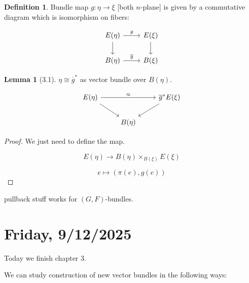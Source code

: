 \documentclass{article}
\theoremstyle{definition}
\newtheorem*{definition}{Definition}
\newtheorem{lemma}[theorem]{Lemma}
\begin{document}
    \begin{definition}
        Bundle map \(g: \eta \to \xi\) [both \(n\)-plane] is given by a commutative diagram which is isomorphism on fibers:

        \[
            \begin{tikzcd}
                E(\eta) \ar[r,"g"] \ar[d] & E(\xi) \ar[d] \\ B(\eta) \ar[r,"\overline{g}"] & B(\xi)
            \end{tikzcd}
        \]
    \end{definition}

    \begin{lemma}
        [3.1] \(\eta \cong \overline{g}^{\ast}\)  as vector bundle over \(B(\eta)\).

        \[
            \begin{tikzcd}
                E(\eta) \ar[rr,"\approx"] \ar[rd] & & \overline{g}^{\ast} E(\xi) \ar[ld] \\ & B(\eta)
            \end{tikzcd}
        \]
    \end{lemma}

    \begin{proof}
        We just need to define the map.

        \[
            E(\eta) \to B(\eta) \times_{B(\xi)} E(\xi)
        \]

        \[
            e \mapsto (\pi(e), g(e))
        \]
    \end{proof}

    pullback stuff works for \((G,F)\)-bundles.

    \section*{Friday, 9/12/2025}
    
    Today we finish chapter 3.

    We can study construction of new vector bundles in the following ways:
\end{document}
